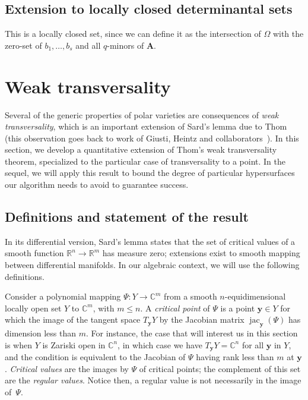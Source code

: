 \documentclass[12pt]{article}
\DeclareMathOperator{\jac}{jac}
\def\C{\mathbb{C}}
\def\R{\mathbb{R}}
\begin{document}
\subsection{Extension to locally closed determinantal sets}

This is a locally closed set, since we can define it as the
intersection of $\Omega$ with the zero-set of $b_1,\dots,b_s$ and all
$q$-minors of $\bm A$.





\section{Weak transversality}

Several of the generic properties of polar varieties are consequences
of {\em weak transversality}, which is an important extension of
Sard's lemma due to Thom (this observation goes back to work of
Giusti, Heintz and collaborators~\cite{BaGiHeMb97,BaGiHeLePa12}).  In
this section, we develop a quantitative extension of Thom's weak
transversality theorem, specialized to the particular case of
transversality to a point. In the sequel, we will apply this result to
bound the degree of particular hypersurfaces our algorithm needs to
avoid to guarantee success.


\subsection{Definitions and statement of the result}

In its differential version, Sard's lemma states that the set of
critical values of a smooth function $\R^n \to \R^m$ has measure zero;
extensions exist to smooth mapping between differential manifolds.  In
our algebraic context, we will use the following definitions.

Consider a polynomial mapping $\Psi : Y \rightarrow \C^m$ from a
smooth $n$-equidimensional locally open set $Y$ to $\C^m$, with $m\le
n$. A {\em critical point} of $\Psi$ is a point $\bm y \in Y$ for
which the image of the tangent space $T_{\bm y} Y$ by the Jacobian
matrix $\jac_{\bm y}(\Psi)$ has dimension less than $m$. For instance,
the case that will interest us in this section is when $Y$ is Zariski
open in $\C^n$, in which case we have $T_{\bm y} Y=\C^n$ for all $\bm
y$ in $Y$, and the condition is equivalent to the Jacobian of $\Psi$
having rank less than $m$ at $\bm y$. {\em Critical values} are the
images by $\Psi$ of critical points; the complement of this set are
the {\em regular values}. Notice then, a regular value is not
necessarily in the image of~$\Psi$.
\end{document}
